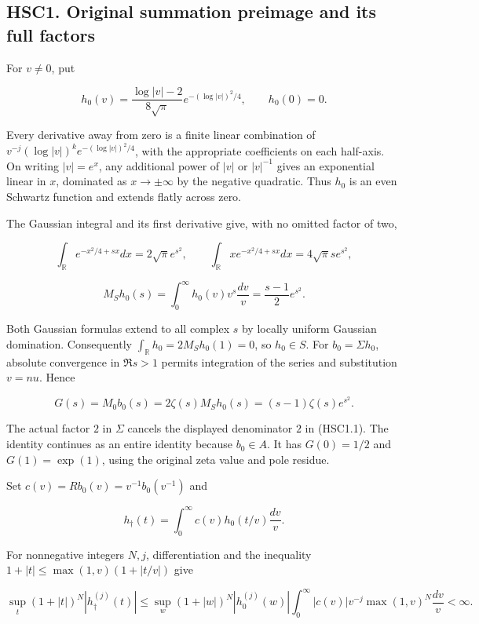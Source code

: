 \subsection{HSC1. Original summation preimage and its full
factors}\label{hsc1.-original-summation-preimage-and-its-full-factors}

For \(v\ne0\), put

\[
 h_0(v)=\frac{\log|v|-2}{8\sqrt\pi}
 e^{-(\log|v|)^2/4},\qquad h_0(0)=0.
\]

Every derivative away from zero is a finite linear combination of
\(v^{-j}(\log|v|)^k e^{-(\log|v|)^2/4}\), with the appropriate
coefficients on each half-axis. On writing \(|v|=e^x\), any additional
power of \(|v|\) or \(|v|^{-1}\) gives an exponential linear in \(x\),
dominated as \(x\to\pm\infty\) by the negative quadratic. Thus \(h_0\)
is an even Schwartz function and extends flatly across zero.

The Gaussian integral and its first derivative give, with no omitted
factor of two,

\[
 \int_{\mathbb R}e^{-x^2/4+sx}dx=2\sqrt\pi e^{s^2},\qquad
 \int_{\mathbb R}x e^{-x^2/4+sx}dx=4\sqrt\pi s e^{s^2},
\]

\[
 M_Sh_0(s)=\int_0^\infty h_0(v)v^s\frac{dv}{v}
 =\frac{s-1}{2}e^{s^2}.
\tag{HSC1.1}
\]

Both Gaussian formulas extend to all complex \(s\) by locally uniform
Gaussian domination. Consequently \(\int_{\mathbb R}h_0=2M_Sh_0(1)=0\),
so \(h_0\in S\). For \(b_0=\Sigma h_0\), absolute convergence in
\(\Re s>1\) permits integration of the series and substitution \(v=nu\).
Hence

\[
 G(s)=M_0b_0(s)=2\zeta(s)M_Sh_0(s)
 =(s-1)\zeta(s)e^{s^2}.
\tag{HSC1.2}
\]

The actual factor \(2\) in \(\Sigma\) cancels the displayed denominator
\(2\) in (HSC1.1). The identity continues as an entire identity because
\(b_0\in A\). It has \(G(0)=1/2\) and \(G(1)=\exp(1)\), using the
original zeta value and pole residue.

Set \(c(v)=Rb_0(v)=v^{-1}b_0(v^{-1})\) and

\[
 h_\dagger(t)=\int_0^\infty c(v)h_0(t/v)\frac{dv}{v}.
\tag{HSC1.3}
\]

For nonnegative integers \(N,j\), differentiation and the inequality
\(1+|t|\le\max(1,v)(1+|t/v|)\) give

\[
 \sup_t(1+|t|)^N|h_\dagger^{(j)}(t)|
 \le \sup_w(1+|w|)^N|h_0^{(j)}(w)|
 \int_0^\infty |c(v)|v^{-j}\max(1,v)^N\frac{dv}{v}<\infty.
\tag{HSC1.4}
\]

